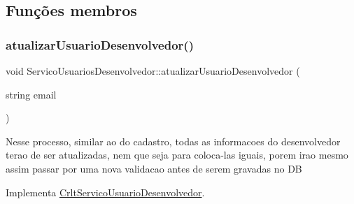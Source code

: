 \subsection{Funções membros}
\mbox{\label{class_servico_usuarios_desenvolvedor_a2dc1811265f101d3ce14150594b25e88}} 
\subsubsection{\texorpdfstring{atualizar\+Usuario\+Desenvolvedor()}{atualizarUsuarioDesenvolvedor()}}
{\footnotesize\ttfamily void Servico\+Usuarios\+Desenvolvedor\+::atualizar\+Usuario\+Desenvolvedor (\begin{DoxyParamCaption}\item[{string}]{email }\end{DoxyParamCaption})\hspace{0.3cm}{\ttfamily [virtual]}}

Nesse processo, similar ao do cadastro, todas as informacoes do desenvolvedor terao de ser atualizadas, nem que seja para coloca-\/las iguais, porem irao mesmo assim passar por uma nova validacao antes de serem gravadas no DB

Implementa \mbox{\hyperlink{class_crlt_servico_usuario_desenvolvedor_a63705805bc01450509e7719e2a57b1da}{Crlt\+Servico\+Usuario\+Desenvolvedor}}.



